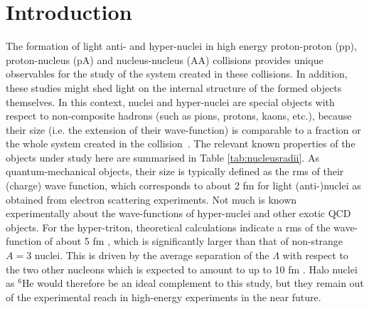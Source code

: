 \documentclass[a4paper,11pt]{scrartcl}
\begin{document}
\section{Introduction} 
The formation of light anti- and hyper-nuclei in high energy proton-proton (pp), proton-nucleus (pA) and nucleus-nucleus (AA) collisions provides unique observables for the study of the system created in these collisions. In addition, these studies might shed light on the internal structure of the formed objects themselves. 
In this context, nuclei and hyper-nuclei are special objects with respect to non-composite hadrons (such as pions, protons, kaons, etc.), because their size (i.e. the extension of their wave-function) is comparable to a fraction or the whole system created in the collision~\cite{Adam:2015vna}.  
The relevant known properties of the objects under study here are summarised in Table \ref{tab:nucleusradii}.
As quantum-mechanical objects, their size is typically defined as the rms of their (charge) wave function, which corresponds to about 2 fm for light (anti-)nuclei as obtained from electron scattering experiments. Not much is known experimentally about the wave-functions of hyper-nuclei and other exotic QCD objects. For the hyper-triton, theoretical calculations indicate a rms of the wave-function of about 5 fm \cite{Nemura:1999qp}, which is significantly larger than that of non-strange $A = 3$ nuclei. This is driven by the average separation of the $\Lambda$ with respect to the two other nucleons which is expected to amount to up to 10 fm \cite{Nemura:1999qp}. Halo nuclei as $^{6}$He would therefore be an ideal complement to this study, but they remain out of the experimental reach in high-energy experiments in the near future.
\end{document}
